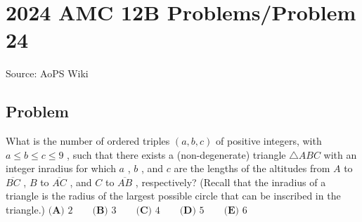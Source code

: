 \documentclass[12pt]{article}
\begin{document}
\section*{{2024 AMC 12B Problems/Problem 24}}
Source: AoPS Wiki

\subsection*{Problem}
What is the number of ordered triples $(a,b,c)$ of positive integers, with $a\le b\le c\le 9$ , such that there exists a (non-degenerate) triangle $\triangle ABC$ with an integer inradius for which $a$ , $b$ , and $c$ are the lengths of the altitudes from $A$ to $\overline{BC}$ , $B$ to $\overline{AC}$ , and $C$ to $\overline{AB}$ , respectively? (Recall that the inradius of a triangle is the radius of the largest possible circle that can be inscribed in the triangle.) $\textbf{(A) }2\qquad \textbf{(B) }3\qquad \textbf{(C) }4\qquad \textbf{(D) }5\qquad \textbf{(E) }6\qquad$
\end{document}
